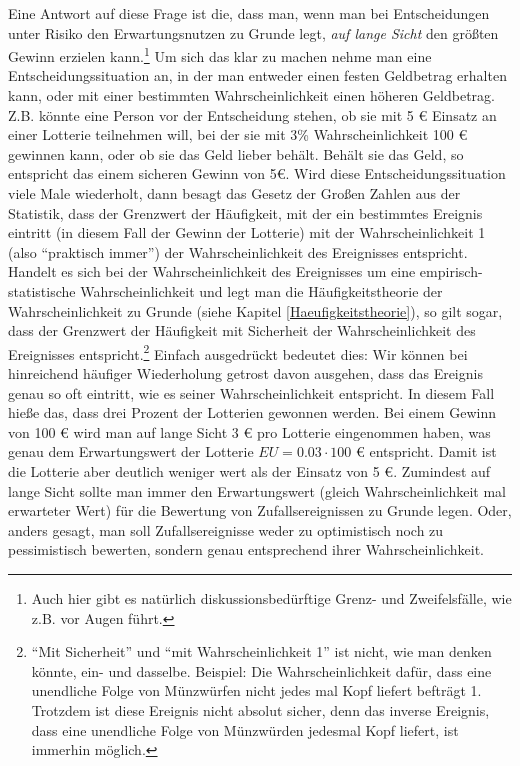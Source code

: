 Eine Antwort auf diese Frage ist die, dass man, wenn man bei Entscheidungen unter
Risiko den Erwartungsnutzen zu Grunde legt, {\em auf lange Sicht} den größten
Gewinn erzielen kann.\footnote{Auch hier gibt es natürlich diskussionsbedürftige
Grenz- und Zweifelsfälle, wie z.B. \cite{okasha:2007} vor Augen führt.} Um sich
das klar zu machen nehme man eine Entscheidungssituation an, in der man entweder
einen festen Geldbetrag erhalten kann, oder mit einer bestimmten
Wahrscheinlichkeit einen höheren Geldbetrag. Z.B. könnte eine Person vor der
Entscheidung stehen, ob sie mit 5 € Einsatz an einer Lotterie teilnehmen will,
bei der sie mit 3\% Wahrscheinlichkeit 100 € gewinnen kann, oder ob sie das Geld
lieber behält. Behält sie das Geld, so entspricht das einem sicheren Gewinn von
5€. Wird diese Entscheidungssituation viele Male wiederholt, dann besagt das
Gesetz der Großen Zahlen aus der Statistik, dass der Grenzwert der Häufigkeit, mit der
ein bestimmtes Ereignis eintritt (in diesem Fall der Gewinn der Lotterie) mit der
Wahrscheinlichkeit 1 (also "`praktisch immer"') der Wahrscheinlichkeit des
Ereignisses entspricht. Handelt es sich bei der Wahrscheinlichkeit des Ereignisses um eine empirisch-statistische
Wahrscheinlichkeit und legt man die Häufigkeitstheorie der Wahrscheinlichkeit zu
Grunde (siehe Kapitel \ref{Haeufigkeitstheorie}), so gilt sogar, dass der
Grenzwert der Häufigkeit mit Sicherheit der Wahrscheinlichkeit des Ereignisses
entspricht.\footnote{"`Mit Sicherheit"' und "`mit Wahrscheinlichkeit 1"' ist
nicht, wie man denken könnte, ein- und dasselbe. Beispiel: Die Wahrscheinlichkeit
dafür, dass eine unendliche Folge von Münzwürfen nicht jedes mal Kopf liefert
befträgt 1. Trotzdem ist diese Ereignis nicht absolut sicher, denn das inverse
Ereignis, dass eine unendliche Folge von Münzwürden jedesmal Kopf liefert, ist
immerhin möglich.} Einfach ausgedrückt bedeutet dies: Wir können bei
hinreichend häufiger Wiederholung getrost davon ausgehen, dass das Ereignis genau so oft
eintritt, wie es seiner Wahrscheinlichkeit entspricht. In diesem Fall hieße das,
dass drei Prozent der Lotterien gewonnen werden. Bei einem Gewinn von 100 € wird
man auf lange Sicht 3 € pro Lotterie eingenommen haben, was genau dem
Erwartungswert der Lotterie $EU=0.03 \cdot 100$ € entspricht. Damit ist die
Lotterie aber deutlich weniger wert als der Einsatz von 5 €. Zumindest auf lange
Sicht sollte man immer den Erwartungswert (gleich Wahrscheinlichkeit mal
erwarteter Wert) für die Bewertung von Zufallsereignissen zu Grunde legen. Oder,
anders gesagt, man soll Zufallsereignisse weder zu optimistisch noch zu
pessimistisch bewerten, sondern genau entsprechend ihrer Wahrscheinlichkeit.

